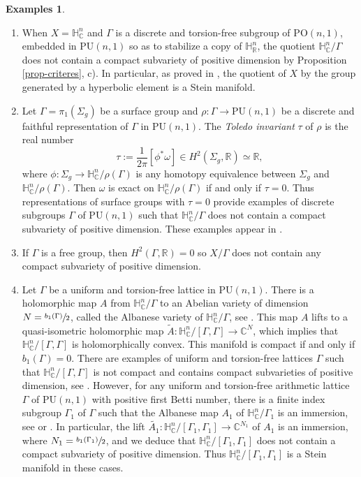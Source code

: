 \documentclass[11pt]{article}
\newcommand{\skpt}{\smallskip}
\theoremstyle{definition}
\newtheorem*{examples}{Examples}
\newcommand{\C}{\mathbb{C}}
\newcommand{\R}{\mathbb{R}}
\newcommand{\HNC}{\mathbb{H}^{n}_{\C}}
\newcommand{\HNR}{\mathbb{H}^{n}_{\R}}
\newcommand{\PU}{\mathrm{PU}}
\newcommand{\PO}{\mathrm{PO}}
\def\C{\mathbb{C}}
\newcommand{\HNC}{\mathbb{H}^{n}_{\C}}
\newcommand{\PU}{\mathrm{PU}}
\begin{document}
\skpt
\begin{examples}
\begin{enumerate}
\item When $X=\HNC$ and $\Gamma$ is a discrete and torsion-free subgroup of $\PO(n,1)$, embedded in $\PU(n,1)$ so as to stabilize a copy of $\HNR$, the quotient $\HNC/\Gamma$ does not contain a compact subvariety of positive dimension by Proposition \ref{prop-criteres}, c). In particular, as proved in \cite{chenDiscreteGroupsHolomorphic2013}, the quotient of $X$ by the group generated by a hyperbolic element is a Stein manifold.
\item Let $\Gamma=\pi_1(\Sigma_g)$ be a surface group and $\rho:\Gamma \to \PU(n,1)$ be a discrete and faithful representation of $\Gamma$ in $\PU(n,1)$. The \textit{Toledo invariant} $\tau$ of $\rho$ is the real number
\begin{equation*}
\tau:= \frac{1}{2\pi}[\phi^{*}\omega] \in H^{2}(\Sigma_g,\R) \simeq \R,
\end{equation*}
where $\phi: \Sigma_g \to \HNC/\rho(\Gamma)$ is any homotopy equivalence between $\Sigma_g$ and $\HNC/\rho(\Gamma)$. Then $\omega$ is exact on $\HNC/\rho(\Gamma)$ if and only if $\tau=0$. Thus representations of surface groups with $\tau=0$ provide examples of discrete subgroups $\Gamma$ of $\PU(n,1)$ such that $\HNC/\Gamma$ does not contain a compact subvariety of positive dimension. These examples appear in \cite[p.\,27]{kapovichSurveyComplexHyperbolic2022}.
\item If $\Gamma$ is a free group, then $H^{2}(\Gamma,\R)=0$ so $X/\Gamma$ does not contain any compact subvariety of positive dimension.
\item Let $\Gamma$ be a uniform and torsion-free lattice in $\PU(n,1)$. There is a holomorphic map $A$ from $\HNC/\Gamma$ to an Abelian variety of dimension $N=\sfrac{b_1(\Gamma)}{2}$, called the Albanese variety of $\HNC/\Gamma$, see \cite[Ch.\,12]{voisinTheorieHodgeGeometrie2002}. This map $A$ lifts to a quasi-isometric holomorphic map $\widetilde{A}: \HNC/[\Gamma,\Gamma] \to \C^{N}$, which implies that $\HNC/[\Gamma,\Gamma]$ is holomorphically convex. This manifold is compact if and only if $b_1(\Gamma)=0$. There are examples of uniform and torsion-free lattices $\Gamma$ such that $\HNC/[\Gamma,\Gamma]$ is not compact and contains compact subvarieties of positive dimension, see \cite{cartwrightCartwrightStegerSurface2017}. However, for any uniform and torsion-free arithmetic lattice $\Gamma$ of $\PU(n,1)$ with positive first Betti number, there is a finite index subgroup $\Gamma_1$ of $\Gamma$ such that the Albanese map $A_1$ of $\HNC/\Gamma_1$ is an immersion, see \cite[\S 3.1]{llosaisenrichSubgroupsHyperbolicGroups2024} or \cite{eyssidieuxOrbifoldKahlerGroups2018}. In particular, the lift $\widetilde{A_1}:\HNC/[\Gamma_1,\Gamma_1] \to \C^{N_1}$ of $A_1$ is an immersion, where $N_1=\sfrac{b_1(\Gamma_1)}{2}$, and we deduce that $\HNC/[\Gamma_1,\Gamma_1]$ does not contain a compact subvariety of positive dimension. Thus $\HNC/[\Gamma_1,\Gamma_1]$ is a Stein manifold in these cases.
\end{enumerate}

\end{examples}
\end{document}
